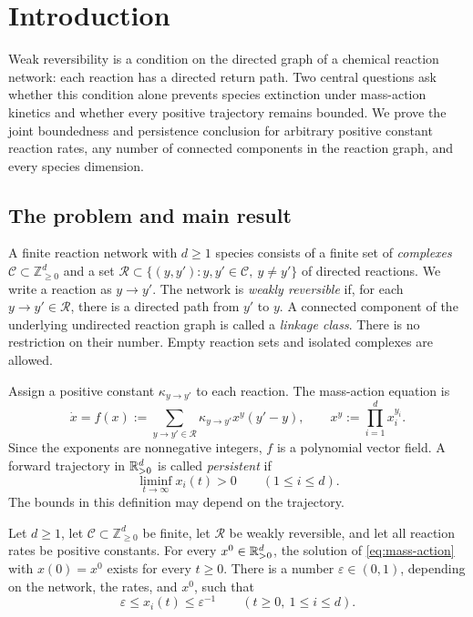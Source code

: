 \section{Introduction}
\label{sec:introduction}

Weak reversibility is a condition on the directed graph of a chemical
reaction network: each reaction has a directed return path. Two central
questions ask whether this condition alone prevents species extinction
under mass-action kinetics and whether every positive trajectory remains
bounded. We prove the joint boundedness and persistence conclusion for
arbitrary positive constant reaction rates, any number of connected
components in the
reaction graph, and every species dimension.

\subsection{The problem and main result}

A finite reaction network with $d\ge1$ species consists of a finite set of
\emph{complexes} $\mathcal C\subset\mathbb Z_{\ge0}^d$ and a set
$\mathcal R\subset\{(y,y'):y,y'\in\mathcal C,\ y\ne y'\}$ of directed
reactions. We write a reaction as $y\to y'$. The network is
\emph{weakly reversible} if, for each $y\to y'\in\mathcal R$, there is a
directed path from $y'$ to $y$. A connected component of the underlying
undirected reaction graph is called a \emph{linkage class}. There is no
restriction on their number. Empty reaction sets and isolated complexes
are allowed.

Assign a positive constant $\kappa_{y\to y'}$ to each reaction. The
mass-action equation is
\begin{equation}\label{eq:mass-action}
 \dot x=f(x):=
 \sum_{y\to y'\in\mathcal R}
 \kappa_{y\to y'}x^y(y'-y),
 \qquad x^y:=\prod_{i=1}^d x_i^{y_i}.
\end{equation}
Since the exponents are nonnegative integers, $f$ is a polynomial vector
field. A forward trajectory in $\mathbb R_{>0}^d$ is called \emph{persistent} if
\[
 \liminf_{t\to\infty}x_i(t)>0\qquad(1\le i\le d).
\]
The bounds in this definition may depend on the trajectory.

\begin{theorem}\label{thm:main}
Let $d\ge1$, let $\mathcal C\subset\mathbb Z_{\ge0}^d$ be finite, let $\mathcal R$ be
weakly reversible, and let all reaction rates be positive constants.
For every $x^0\in\mathbb R_{>0}^d$, the solution of \eqref{eq:mass-action} with
$x(0)=x^0$ exists for every $t\ge0$. There is a number
$\varepsilon\in(0,1)$, depending on the network, the rates, and $x^0$, such
that
\begin{equation}\label{eq:main-bounds}
 \varepsilon\le x_i(t)\le\varepsilon^{-1}
 \qquad(t\ge0,\ 1\le i\le d).
\end{equation}
\end{theorem}

